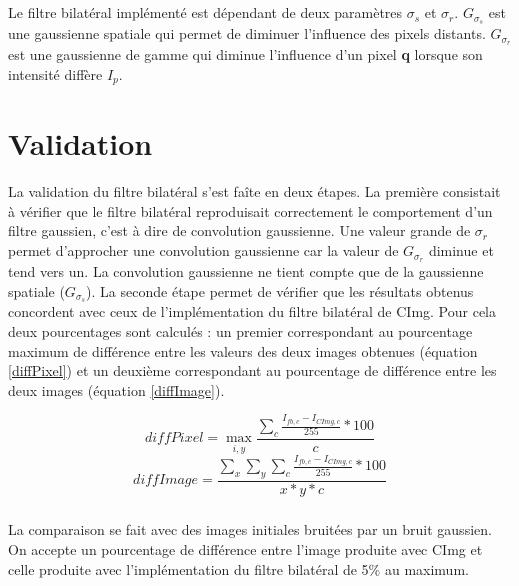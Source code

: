 \documentclass[twoside,UTF8]{EPURapport}
\begin{document}
\paragraph{}
Le filtre bilatéral implémenté est dépendant de deux paramètres $\sigma_s$ et $\sigma_r$. $G_{\sigma_{s}}$ est une gaussienne spatiale qui permet de diminuer l'influence des pixels distants. $G_{\sigma_{r}}$ est une gaussienne de gamme qui diminue l'influence d'un pixel \textbf{q} lorsque son intensité diffère \textbf{$I_p$}.


\chapter{Validation}

La validation du filtre bilatéral s'est faîte en deux étapes. La première consistait à vérifier que le filtre bilatéral reproduisait correctement le comportement d'un filtre gaussien, c'est à dire de convolution gaussienne. Une valeur grande de $\sigma_r$ permet d'approcher une convolution gaussienne car la valeur de $G_{\sigma_r}$ diminue et tend vers un. La convolution gaussienne ne tient compte que de la gaussienne spatiale ($G_{\sigma_s}$). 
La seconde étape permet de vérifier que les résultats obtenus concordent avec ceux de l'implémentation du filtre bilatéral de CImg. Pour cela deux pourcentages sont calculés : un premier correspondant au pourcentage maximum de différence entre les valeurs des deux images obtenues (équation \ref{diffPixel}) et un deuxième correspondant au pourcentage de différence entre les deux images (équation \ref{diffImage}).

\begin{equation}\label{diffPixel}
	diffPixel = \max_{i, y} \frac{\sum\limits_{c}\frac{I_{fb,c} - I_{CImg,c}}{255} * 100}{c} 
\end{equation}
\begin{equation}\label{diffImage}
	diffImage = \frac{\sum\limits_{x} \sum\limits_{y} \sum\limits_{c} \frac{I_{fb,c} - I_{CImg,c}}{255} * 100 }{x*y*c}
\end{equation}

\paragraph{}
La comparaison se fait avec des images initiales bruitées par un bruit gaussien. On accepte un pourcentage de différence entre l'image produite avec CImg et celle produite avec l'implémentation du filtre bilatéral de 5\% au maximum. 
\end{document}
